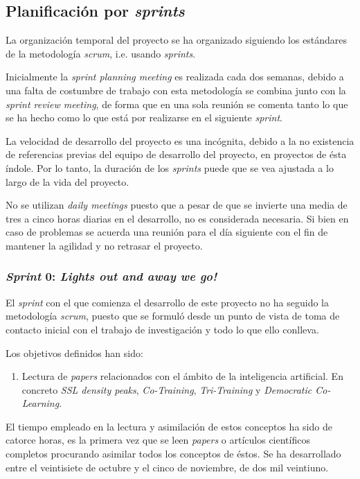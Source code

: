 \subsection{Planificación por \textit{sprints}}
La organización temporal del proyecto se ha organizado siguiendo los estándares de la metodología \textit{scrum}, i.e. usando \textit{sprints}. 

Inicialmente la \textit{sprint planning meeting} es realizada cada dos semanas, debido a una falta de costumbre de trabajo con esta metodología se combina junto con la \textit{sprint review meeting}, de forma que en una sola reunión se comenta tanto lo que se ha hecho como lo que está por realizarse en el siguiente \textit{sprint}.

La velocidad de desarrollo del proyecto es una incógnita, debido a la no existencia de referencias previas del equipo de desarrollo del proyecto, en proyectos de ésta índole. Por lo tanto, la duración de los \textit{sprints} puede que se vea ajustada a lo largo de la vida del proyecto.

No se utilizan \textit{daily meetings} puesto que a pesar de que se invierte una media de tres a cinco horas diarias en el desarrollo, no es considerada necesaria. Si bien en caso de problemas se acuerda una reunión para el día siguiente con el fin de mantener la agilidad y no retrasar el proyecto.

\subsubsection{\textit{Sprint} 0: \textit{Lights out and away we go!} }
El \textit{sprint} con el que comienza el desarrollo de este proyecto no ha seguido la metodología \textit{scrum}, puesto que se formuló desde un punto de vista de toma de contacto inicial con el trabajo de investigación y todo lo que ello conlleva.

Los objetivos definidos han sido:
\begin{enumerate}
\item Lectura de \textit{papers} relacionados con el ámbito de la inteligencia artificial. En concreto \textit{SSL density peaks}\cite{wu2018self}, \textit{Co-Training}\cite{blum1998combining}, \textit{Tri-Training}\cite{zhou2005tri} y \textit{Democratic Co-Learning}\cite{zhou2004democratic}.
\end{enumerate}

El tiempo empleado en la lectura y asimilación de estos conceptos ha sido de catorce horas, es la primera vez que se leen \textit{papers} o artículos científicos completos procurando asimilar todos los conceptos de éstos. Se ha desarrollado entre el veintisiete de octubre y el cinco de noviembre, de dos mil veintiuno. 

